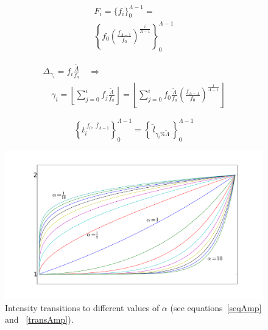 \documentclass[
 aip,
 jmp,
 amsmath,amssymb,
 reprint,
]{revtex4-1}
\begin{document}
\begin{multline}\label{freqExponencial}
 F_i=\{f_i\}_0^{\Lambda-1}= \\ \left\{f_0 \left ( \frac{f_{\Lambda-1}}{f_0} \right ) ^{\frac{i}{\Lambda -1}} \right\}_0^{\Lambda-1}
\end{multline}

\begin{multline}\label{indiceExponencial}
 \Delta_{\gamma_i}=f_i\frac{\widetilde{\Lambda}}{f_a} \quad \Rightarrow \\ \quad \gamma_i=\left \lfloor \sum_{j=0}^{i} f_j\frac{\widetilde{\Lambda}}{f_a} \right \rfloor   =\left \lfloor \sum_{j=0}^{i} f_0 \frac{\widetilde{\Lambda}}{f_a} \left ( \frac{f_{\Lambda-1}}{f_0} \right ) ^{\frac{j}{\Lambda -1}} \right \rfloor
\end{multline}

\begin{equation}\label{serieAmostralLog}
 \left\{t_i^{\;\overline{f_0,\,f_{\Lambda-1}}}\right\}_0^{\Lambda-1}=\left\{\,\widetilde{l}_{\gamma_i \% \widetilde{\Lambda}}\,\right\}_0^{\Lambda-1}
\end{equation}

\begin{figure}[h!]
     \centering
         \includegraphics[width=\columnwidth]{figures/transicao}
     \caption{Intensity transitions to different values of $\alpha$ (see equations~\ref{seqAmp} and ~\ref{transAmp}).}
         \label{fig:transicao}
\end{figure}
\end{document}
